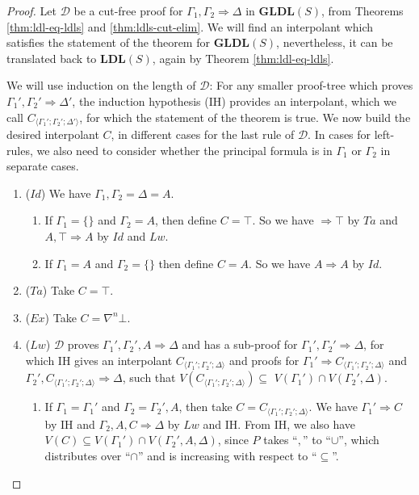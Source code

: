 \documentclass[12pt,a4paper]{article}
\theoremstyle{plain}
\theoremstyle{definition}
\begin{document}
\begin{proof}
Let $\mathcal{D}$ be a cut-free proof for $\Gamma_1 , \Gamma_2 \Rightarrow \Delta$ in $\mathbf{GLDL}(S)$, from Theorems \ref{thm:ldl-eq-ldls} and \ref{thm:ldls-cut-elim}. We will find an interpolant which satisfies the statement of the theorem for $\mathbf{GLDL}(S)$, nevertheless, it can be translated back to $\mathbf{LDL}(S)$, again by Theorem \ref{thm:ldl-eq-ldls}.

We will use induction on the length of $\mathcal{D}$: For any smaller proof-tree which proves $\Gamma_1' , \Gamma_2' \Rightarrow \Delta'$, the induction hypothesis (IH) provides an interpolant, which we call $C_{\langle\Gamma_1'; \Gamma_2'; \Delta'\rangle}$, for which the statement of the theorem is true. We now build the desired interpolant $C$, in different cases for the last rule of $\mathcal{D}$. In cases for left-rules, we also need to consider whether the principal formula is in $\Gamma_1$ or $\Gamma_2$ in separate cases.
\begin{enumerate}
	\item ($Id$) We have $\Gamma_1,\Gamma_2 = \Delta = A$.
	\begin{enumerate}
		\item If $\Gamma_1 = \{\}$ and $\Gamma_2 = A$, then define $C = \top$. So we have $\Rightarrow \top$ by $Ta$ and $A , \top \Rightarrow A$ by $Id$ and $Lw$.
		
		\item If $\Gamma_1 = A$ and $\Gamma_2 = \{\}$ then define $C = A$. So we have $A \Rightarrow A$ by $Id$.
	\end{enumerate}
	\item ($Ta$) Take $C = \top$.
	
	\item ($Ex$) Take $C = \nabla^n \bot$.
	
	\item ($Lw$) $\mathcal{D}$ proves $\Gamma_1' , \Gamma_2' , A \Rightarrow \Delta$ and has a sub-proof for $\Gamma_1' , \Gamma_2' \Rightarrow \Delta$, for which IH gives an interpolant $C_{\langle\Gamma_1';\Gamma_2';\Delta\rangle}$ and proofs for $\Gamma_1' \Rightarrow C_{\langle\Gamma_1';\Gamma_2';\Delta\rangle}$ and $\Gamma_2' , C_{\langle\Gamma_1';\Gamma_2';\Delta\rangle} \Rightarrow \Delta$, such that $V(C_{\langle\Gamma_1';\Gamma_2';\Delta\rangle}) \subseteq$ $ V(\Gamma_1') \cap V(\Gamma_2' , \Delta)$.
	\begin{enumerate}
		\item If $\Gamma_1 = \Gamma_1'$ and $\Gamma_2 = \Gamma_2' , A$, then take $C = C_{\langle\Gamma_1';\Gamma_2';\Delta\rangle}$. We have  $\Gamma_1' \Rightarrow C$ by IH and $\Gamma_2 , A , C \Rightarrow \Delta$ by $Lw$ and IH. From IH, we also have $V(C) \subseteq V(\Gamma_1') \cap V(\Gamma_2' , A , \Delta)$, since $P$ takes ``$,$'' to ``$\cup$'', which distributes over ``$\cap$'' and is increasing with respect to ``$\subseteq$''.
		

\end{enumerate}
\end{enumerate}
\end{proof}
\end{document}

